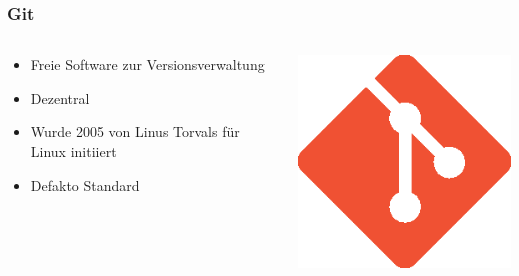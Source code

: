 \documentclass[aspectratio=169]{beamer}
\begin{document}
\begin{frame}
    \frametitle{Git}
    \begin{columns}
        \begin{column}{.7\textwidth}
            \begin{itemize}
                \item<1-> Freie Software zur Versionsverwaltung
                \item<2-> Dezentral
                \item<3-> Wurde 2005 von Linus Torvals für Linux initiiert
                \item<4-> Defakto Standard
            \end{itemize}
        \end{column}
        \begin{column}{.3\textwidth}
            \includegraphics[width=\textwidth]{Git-Icon-1788C.eps}
        \end{column}
    \end{columns}
\end{frame}
\end{document}
